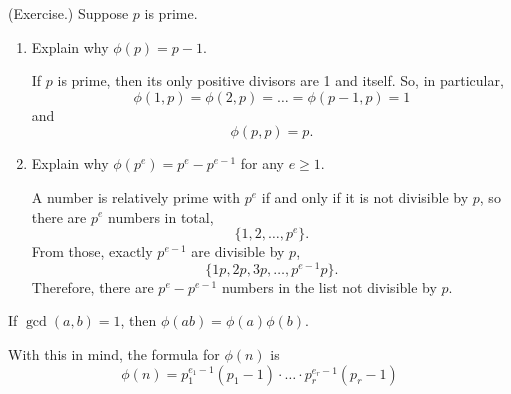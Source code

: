 \documentclass[letterpaper]{article}
\begin{document}
\begin{mdframed}
    (Exercise.) Suppose $p$ is prime. 
    \begin{enumerate}
        \item Explain why $\phi(p) = p - 1$. 
        \begin{mdframed}
            If $p$ is prime, then its only positive divisors are 1 and itself. So, in particular, 
            \[\phi(1, p) = \phi(2, p) = \hdots = \phi(p - 1, p) = 1\]
            and 
            \[\phi(p, p) = p.\]
        \end{mdframed}

        \item Explain why $\phi(p^e) = p^e - p^{e - 1}$ for any $e \geq 1$. 
        \begin{mdframed}
            A number is relatively prime with $p^e$ if and only if it is not divisible by $p$, so there are $p^e$ numbers in total, \[\{1, 2, \hdots, p^e\}.\] From those, exactly $p^{e - 1}$ are divisible by $p$, \[\{1p, 2p, 3p, \hdots, p^{e - 1}p\}.\] Therefore, there are $p^e - p^{e - 1}$ numbers in the list not divisible by $p$.
        \end{mdframed}
    \end{enumerate}
\end{mdframed}

\begin{lemma}{}{}
    If $\gcd(a, b) = 1$, then $\phi(ab) = \phi(a)\phi(b)$. 
\end{lemma}
With this in mind, the formula for $\phi(n)$ is 
\[\phi(n) = p_{1}^{e_1 - 1}(p_1 - 1) \cdot \hdots \cdot p_{r}^{e_r - 1}(p_r - 1)\]
\end{document}
